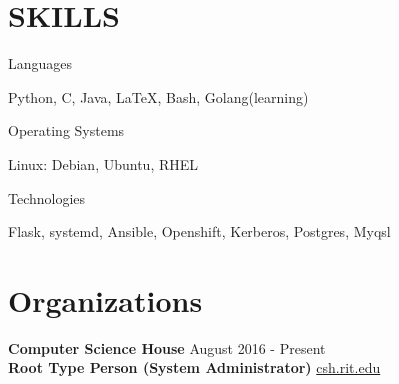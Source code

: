 \documentclass[line, margin]{res}
\begin{document}
\begin{resume}
\section{SKILLS}
\begin{compactdesc}
    \item[Languages] \begin{inparaenum} {Python, C, Java, \LaTeX, Bash, Golang(learning)} \end{inparaenum}
    \item[Operating Systems] \begin{inparaenum} {Linux: Debian, Ubuntu, RHEL} \end{inparaenum}
    \item[Technologies] \begin{inparaenum} {Flask, systemd, Ansible, Openshift, Kerberos, Postgres, Myqsl} \end{inparaenum}
\end{compactdesc}

\section{Organizations}
{\bf \large{Computer Science House}} \hfill August 2016 - Present \\
{\bf Root Type Person (System Administrator)} \hfill \url{csh.rit.edu} \\



\end{resume}
\end{document}
